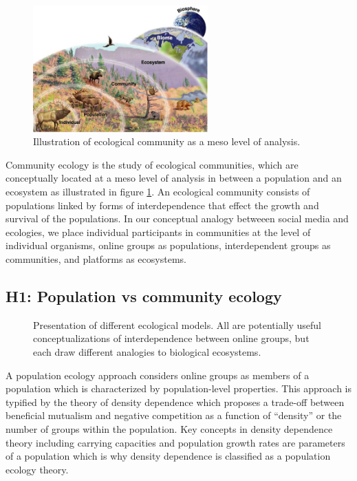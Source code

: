 \documentclass[12pt]{memoir}
\begin{document}
\begin{figure}[h]
\centering
  \includegraphics[width=0.6\textwidth]{resources/ecological_community.jpg}
  \caption{Illustration of ecological community as a meso level of analysis.\label{fig:ecocom}}
\end{figure}
Community ecology is the study of ecological communities, which are conceptually located at a meso level of analysis in between a population and an ecosystem as illustrated in figure \ref{fig:ecocom}.  An ecological community consists of populations linked by forms of interdependence that effect the growth and survival of the populations.  In our conceptual analogy betweeen social media and ecologies, we place individual participants in communities at the level of individual organisms, online groups as populations, interdependent groups as communities, and platforms as ecosystems. 

\subsection{\textbf{H1:} Population vs community ecology}

\begin{figure}[h!]
  \centering
\resizebox{!}{18cm}{
  
}
  \caption{Presentation of different ecological models.  All are potentially useful conceptualizations of interdependence between online groups, but each draw different analogies to biological ecosystems.\label{fig:H1_chart}}
\end{figure}

A population ecology approach considers online groups as members of a population which is characterized by population-level properties. This approach is typified by the theory of density dependence which proposes a trade-off between beneficial mutualism and negative competition as a function of ``density'' or the number of groups within the population.  Key concepts in density dependence theory including carrying capacities and population growth rates are parameters of a population which is why density dependence is classified as a population ecology theory.
\end{document}
